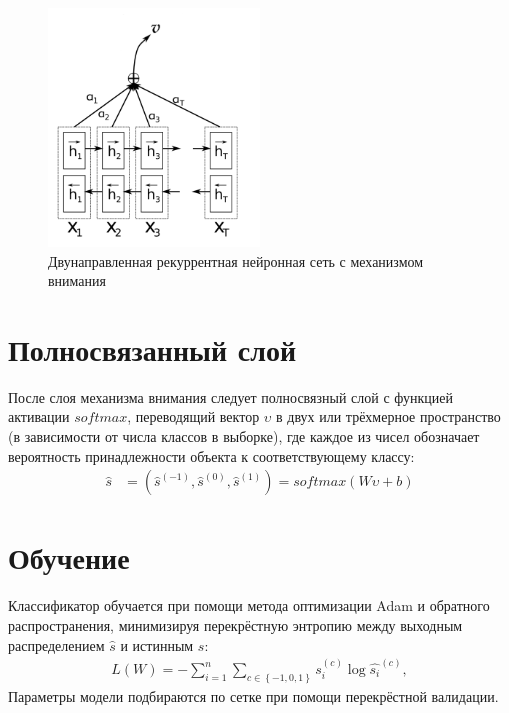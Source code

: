 \begin{figure}[H]
  \centering
  \includegraphics[width=0.5\textwidth]{images/att_edited.png}
  \caption{Двунаправленная рекуррентная нейронная сеть с механизмом внимания}
  \label{fig:att}
\end{figure}
\section{Полносвязанный слой}
После слоя механизма внимания следует полносвязный слой с функцией активации $softmax$, переводящий вектор $\upsilon$ в двух или трёхмерное пространство (в зависимости от числа классов в выборке), где каждое из чисел обозначает вероятность принадлежности объекта к соответствующему классу:
	\begin{align}	
    \hat{s}&=(\hat{s}^{(-1)},\hat{s}^{(0)},\hat{s}^{(1)})=softmax(W\upsilon+b)
	\end{align}
\section{Обучение}
Классификатор обучается при помощи метода оптимизации Adam и обратного распространения, минимизируя перекрёстную энтропию между выходным распределением $\hat{s}$ и истинным $s$:
    \begin{align}
    L(W)=-\sum_{i=1}^{n}\sum_{c\in\left \{ -1,0,1 \right \}}s_{i}^{(c)}\log{\hat{s_{i}}^{(c)}},
    \end{align}
Параметры модели подбираются по сетке при помощи перекрёстной валидации.
